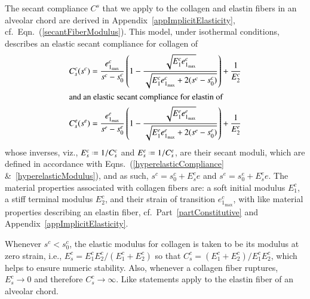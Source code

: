 The secant compliance $C^s$ that we apply to the collagen and elastin fibers in an alveolar chord are derived in Appendix~\ref{appImplicitElasticity}, cf.\ Eqn.~(\ref{secantFiberModulus}).  This model, under isothermal conditions, describes an elastic secant compliance for collagen of
\begin{subequations}
    \label{fiberCompliance}
    \begin{align}
    C_s^c (s^c) & = \frac{e^c_{1_{\max}}}{s^c - s^c_0} \left( 
    1 - \frac{\sqrt{E^c_1 e^c_{1_{\max}}}}{\sqrt{E^c_1 e^c_{1_{\max}} + 
            2 (s^c - s^c_0)}} \right) + \frac{1}{E^c_2} \\
    \intertext{and an elastic secant compliance for elastin of}
    C_s^e (s^e) & = \frac{e^e_{1_{\max}}}{s^e - s^e_0} \left( 
    1 - \frac{\sqrt{E^e_1 e^e_{1_{\max}}}}{\sqrt{E^e_1 e^e_{1_{\max}} + 
            2 (s^e - s^e_0)}} \right) + \frac{1}{E^e_2}
    \end{align}
\end{subequations}
whose inverses, viz., $E^c_s \defeq 1 / C^c_s$ and $E^e_s \defeq 1 / C^e_s$, are their secant moduli, which are defined in accordance with Eqns.~(\ref{hyperelasticCompliance} \&\ \ref{hyperelasticModulus}), and as such, $s^c = s_0^c + E^c_s e$ and $s^e = s_0^e + E^e_s e$.  The material properties associated with collagen fibers are: a soft initial modulus $E^c_1$, a stiff terminal modulus $E^c_2$, and their strain of transition $e^c_{1_{\max}}$, with like material properties describing an elastin fiber, cf.\ Part~\ref{partConstitutive} and Appendix~\ref{appImplicitElasticity}.

Whenever $s^c < s^c_0$, the elastic modulus for collagen is taken to be its modulus at zero strain, i.e., $E^c_s = E^c_1 E^c_2 / ( E^c_1 + E^c_2 )$ so that $C^c_s = (E^c_1 + E^c_2) / E^c_1 E^c_2$, which helps to ensure numeric stability.  Also, whenever a collagen fiber ruptures, $E^c_s \to 0$ and therefore $C^c_s \to \infty$.  Like statements apply to the elastin fiber of an alveolar chord.

